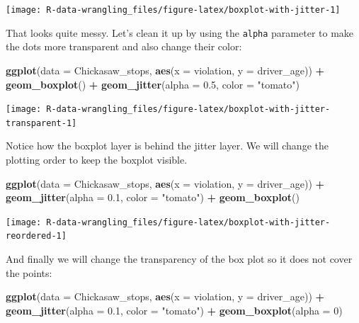 \documentclass[]{book}
\newenvironment{Shaded}{\begin{snugshade}}{\end{snugshade}}
\newcommand{\DataTypeTok}[1]{\textcolor[rgb]{0.13,0.29,0.53}{#1}}
\newcommand{\DecValTok}[1]{\textcolor[rgb]{0.00,0.00,0.81}{#1}}
\newcommand{\FloatTok}[1]{\textcolor[rgb]{0.00,0.00,0.81}{#1}}
\newcommand{\KeywordTok}[1]{\textcolor[rgb]{0.13,0.29,0.53}{\textbf{#1}}}
\newcommand{\NormalTok}[1]{#1}
\newcommand{\OperatorTok}[1]{\textcolor[rgb]{0.81,0.36,0.00}{\textbf{#1}}}
\newcommand{\StringTok}[1]{\textcolor[rgb]{0.31,0.60,0.02}{#1}}
\begin{document}
\texttt{[image: R-data-wrangling\_files/figure-latex/boxplot-with-jitter-1]}

That looks quite messy. Let's clean it up by using the \texttt{alpha} parameter to make the dots more transparent and also change their color:

\begin{Shaded}
\begin{Highlighting}[]
\KeywordTok{ggplot}\NormalTok{(}\DataTypeTok{data =}\NormalTok{ Chickasaw_stops, }\KeywordTok{aes}\NormalTok{(}\DataTypeTok{x =}\NormalTok{ violation, }\DataTypeTok{y =}\NormalTok{ driver_age)) }\OperatorTok{+}
\StringTok{    }\KeywordTok{geom_boxplot}\NormalTok{() }\OperatorTok{+}
\StringTok{    }\KeywordTok{geom_jitter}\NormalTok{(}\DataTypeTok{alpha =} \FloatTok{0.5}\NormalTok{, }\DataTypeTok{color =} \StringTok{"tomato"}\NormalTok{)}
\end{Highlighting}
\end{Shaded}

\texttt{[image: R-data-wrangling\_files/figure-latex/boxplot-with-jitter-transparent-1]}

Notice how the boxplot layer is behind the jitter layer. We will change the plotting order to keep the boxplot visible.

\begin{Shaded}
\begin{Highlighting}[]
\KeywordTok{ggplot}\NormalTok{(}\DataTypeTok{data =}\NormalTok{ Chickasaw_stops, }\KeywordTok{aes}\NormalTok{(}\DataTypeTok{x =}\NormalTok{ violation, }\DataTypeTok{y =}\NormalTok{ driver_age)) }\OperatorTok{+}
\StringTok{    }\KeywordTok{geom_jitter}\NormalTok{(}\DataTypeTok{alpha =} \FloatTok{0.1}\NormalTok{, }\DataTypeTok{color =} \StringTok{"tomato"}\NormalTok{) }\OperatorTok{+}\StringTok{ }
\StringTok{    }\KeywordTok{geom_boxplot}\NormalTok{()}
\end{Highlighting}
\end{Shaded}

\texttt{[image: R-data-wrangling\_files/figure-latex/boxplot-with-jitter-reordered-1]}

And finally we will change the transparency of the box plot so it does not cover the points:

\begin{Shaded}
\begin{Highlighting}[]
\KeywordTok{ggplot}\NormalTok{(}\DataTypeTok{data =}\NormalTok{ Chickasaw_stops, }\KeywordTok{aes}\NormalTok{(}\DataTypeTok{x =}\NormalTok{ violation, }\DataTypeTok{y =}\NormalTok{ driver_age)) }\OperatorTok{+}
\StringTok{    }\KeywordTok{geom_jitter}\NormalTok{(}\DataTypeTok{alpha =} \FloatTok{0.1}\NormalTok{, }\DataTypeTok{color =} \StringTok{"tomato"}\NormalTok{) }\OperatorTok{+}
\StringTok{    }\KeywordTok{geom_boxplot}\NormalTok{(}\DataTypeTok{alpha =} \DecValTok{0}\NormalTok{)  }
\end{Highlighting}
\end{Shaded}
\end{document}

